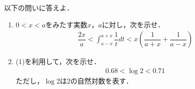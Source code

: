 \documentclass[../../main.tex]{subfiles}
\begin{document}
以下の問いに答えよ．
\begin{enumerate}
  \item $0<x<a$をみたす実数$x$，$a$に対し，次を示せ．
    \begin{align*}
      \dfrac{2x}{a} < \int_{a-x}^{a+x}\dfrac{1}{t}dt < x \left( \dfrac{1}{a+x}+\dfrac{1}{a-x} \right)
    \end{align*}
  \item (1)を利用して，次を示せ．
    \begin{align*}
      0.68 < \log 2 < 0.71
    \end{align*}
    ただし，$\log 2$は2の自然対数を表す．
\end{enumerate}
\end{document}
